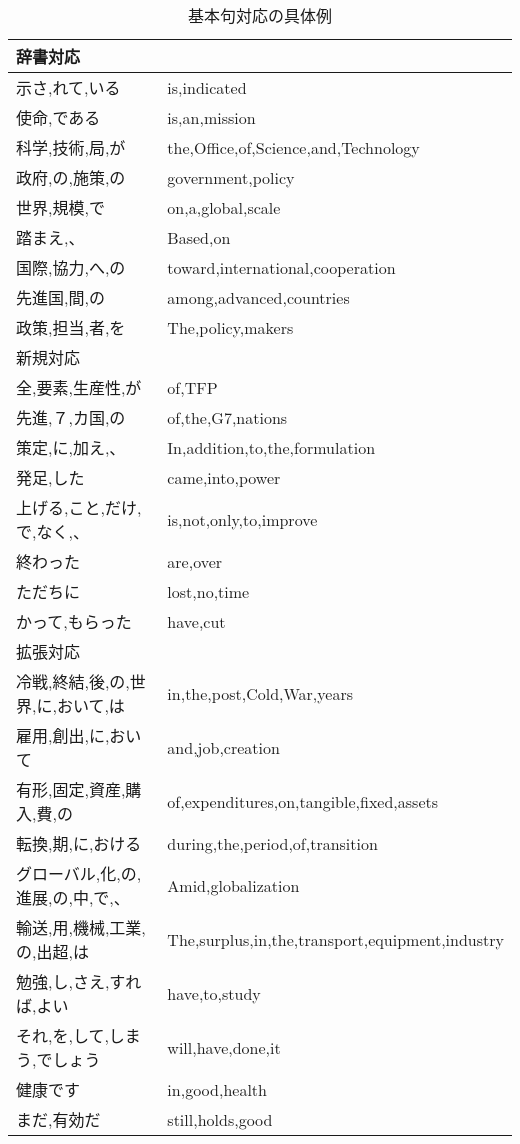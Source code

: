 \begin{table}
\begin{center}
\begin{tabular}{ll}
\hline
\hline
	辞書対応	&				\\
\hline								
	示さ,れて,いる	&	is,indicated			\\
	使命,である	&	is,an,mission			\\
	科学,技術,局,が	&	the,Office,of,Science,and,Technology	\\
	政府,の,施策,の	&	government,policy			\\
	世界,規模,で	&	on,a,global,scale			\\
	踏まえ,、	&	Based,on				\\
	国際,協力,へ,の	&	toward,international,cooperation	\\
	先進国,間,の	&	among,advanced,countries		\\
	政策,担当,者,を	&	The,policy,makers			\\
\hline
\hline
	新規対応	&				\\
\hline								
	全,要素,生産性,が	&	of,TFP			\\
	先進,７,カ国,の		&	of,the,G7,nations	\\
	策定,に,加え,、		&	In,addition,to,the,formulation	\\
	発足,した		&	came,into,power			\\
	上げる,こと,だけ,で,なく,、&	is,not,only,to,improve		\\
	終わった		&	are,over			\\
	ただちに		&	lost,no,time			\\
	かって,もらった		&	have,cut			\\
\hline
\hline
	拡張対応	&				\\
\hline
	冷戦,終結,後,の,世界,に,おいて,は	&	in,the,post,Cold,War,years	\\
	雇用,創出,に,おいて			&	and,job,creation			\\
	有形,固定,資産,購入,費,の		&	of,expenditures,on,tangible,fixed,assets	\\
	転換,期,に,おける			&	during,the,period,of,transition			\\
	グローバル,化,の,進展,の,中,で,、	&	Amid,globalization				\\
	輸送,用,機械,工業,の,出超,は		&	The,surplus,in,the,transport,equipment,industry	\\
	勉強,し,さえ,すれば,よい		&	have,to,study					\\
	それ,を,して,しまう,でしょう		&	will,have,done,it			\\
	健康です				&	in,good,health			\\
	まだ,有効だ				&	still,holds,good		\\
\hline

\end{tabular}
\caption{基本句対応の具体例}
\label{tb具体例}
\end{center}
\end{table}



